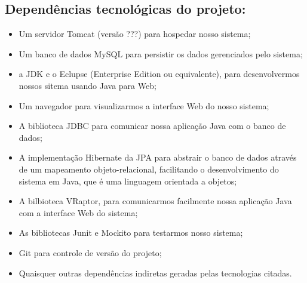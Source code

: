 \documentclass[11pt, a4paper]{article}
\begin{document}
        \subsection{Dependências tecnológicas do projeto:}
            \begin{itemize}
                \item Um servidor Tomcat (versão ???) para hospedar nosso
                sistema;
                
                \item Um banco de dados MySQL para persistir os dados
                gerenciados pelo sistema;
                
                \item a JDK e o Eclupse (Enterprise Edition ou equivalente),
                para desenvolvermos nossos sitema usando Java para Web;
                
                \item Um navegador para visualizarmos a interface Web do nosso
                sistema;
                
                \item A biblioteca JDBC para comunicar nossa aplicação Java com
                o banco de dados;
                
                \item A implementação Hibernate da JPA para abstrair o banco de
                dados através de um mapeamento objeto-relacional, facilitando
                o desenvolvimento do sistema em Java, que é uma linguagem
                orientada a objetos;
                
                \item A bilbioteca VRaptor, para comunicarmos facilmente nossa
                aplicação Java com a interface Web do sistema;
                
                \item As bibliotecas Junit e Mockito para testarmos nosso
                sistema;
                
                \item Git para controle de versão do projeto;
                
                \item Quaisquer outras dependências indiretas geradas pelas
                tecnologias citadas.
            \end{itemize}
\end{document}
